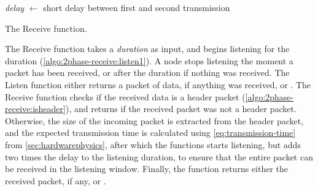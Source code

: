 \begin{algorithm}[ht]
    \DontPrintSemicolon
    \textit{delay} $\leftarrow$ short delay between first and second transmission\;
    \;
    
    \caption{The Receive function.}
    \label{algo:2phase-receive}
\end{algorithm}

The Receive function takes a \textit{duration} as input, and begins listening for the duration
(\autoref{algo:2phase-receive:listen1}). A node stops listening the moment a packet has been received, or
after the duration if nothing was received. The Listen function either returns a packet of data, if anything
was received, or \KwNull. The Receive function checks if the received data is a header packet
(\autoref{algo:2phase-receive:isheader}), and returns \KwNull if the received packet was not a header packet.
Otherwise, the size of the incoming packet is extracted from the header packet, and the expected transmission
time is calculated using \autoref{eq:transmission-time} from \autoref{sec:hardwarephysics}, after which the
functions starts listening, but adds two times the delay to the listening duration, to ensure that the entire
packet can be received in the listening window. Finally, the function returns either the received packet, if
any, or \KwNull.